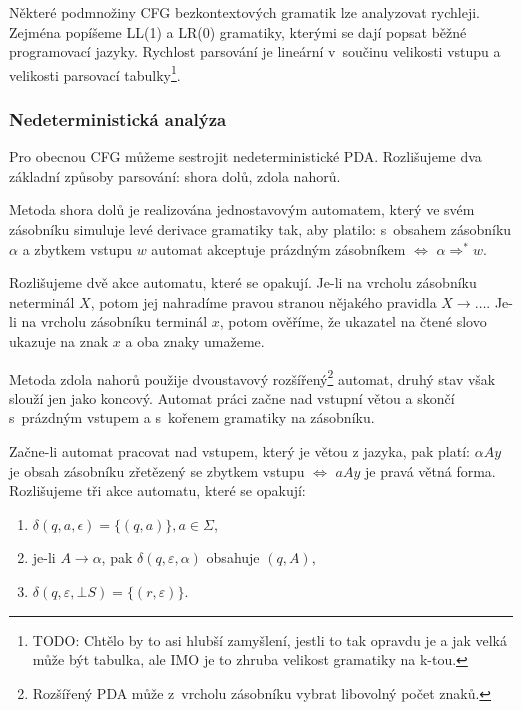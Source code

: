 Některé podmnožiny CFG bezkontextových gramatik lze analyzovat rychleji.
Zejména popíšeme LL(1) a LR(0) gramatiky, kterými se dají popsat běžné
programovací jazyky. Rychlost parsování je lineární v~součinu velikosti
vstupu a velikosti parsovací tabulky\footnote{TODO: Chtělo by to asi hlubší
zamyšlení, jestli to tak opravdu je a jak velká může být tabulka, ale
IMO je to zhruba velikost gramatiky na k-tou.}.

\subsubsection{Nedeterministická analýza}

Pro obecnou CFG můžeme sestrojit nedeterministické PDA. Rozlišujeme dva
základní způsoby parsování: shora dolů, zdola nahorů.

Metoda shora dolů je realizována jednostavovým automatem, který ve svém
zásobníku simuluje levé derivace gramatiky tak, aby platilo:
s~obsahem zásobníku $\alpha$ a zbytkem vstupu $w$ automat akceptuje
prázdným zásobníkem $\iff$ $\alpha \Rightarrow^* w$.

Rozlišujeme dvě akce automatu, které se opakují.
Je-li na vrcholu zásobníku neterminál
$X$, potom jej nahradíme pravou stranou nějakého pravidla $X \to
\ldots$. Je-li na vrcholu zásobníku terminál $x$, potom ověříme,
že ukazatel na čtené slovo ukazuje na znak $x$ a oba znaky umažeme.

\begin{example}

\end{example}

Metoda zdola nahorů použije dvoustavový rozšířený\footnote{Rozšířený
PDA může z~vrcholu zásobníku vybrat libovolný počet znaků.} automat, druhý
stav však slouží jen jako koncový. Automat práci začne
nad vstupní větou a skončí s~prázdným vstupem a s~kořenem gramatiky na
zásobníku.

Začne-li automat pracovat nad vstupem, který je větou z jazyka, pak
platí: $\alpha A y$ je obsah zásobníku zřetězený se zbytkem vstupu
$\iff$ $a A y$ je pravá větná forma. Rozlišujeme tři akce automatu,
které se opakují:
\begin{enumerate}
    \item $\delta(q, a, \epsilon) = \{ (q, a) \}, a \in \Sigma$,
    \item je-li $A \to \alpha$, pak $\delta(q, \varepsilon, \alpha)$
        obsahuje $(q, A)$,
    \item $\delta(q, \varepsilon, \bot S) = \{ (r, \varepsilon) \}$.
\end{enumerate}

